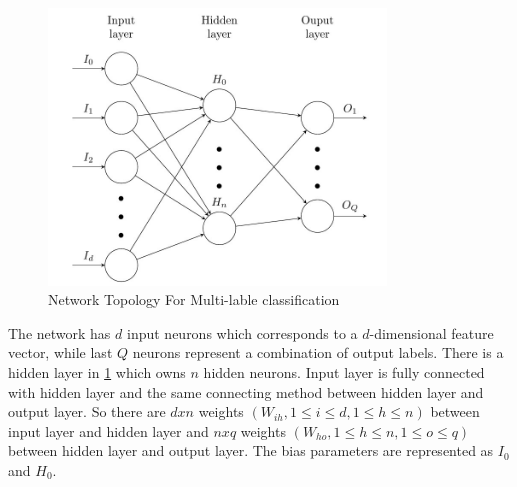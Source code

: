 \graphicspath{ {./Figures/} }
\begin{figure}[!htb]
\centering
\includegraphics[width=0.8\textwidth]{MultiLabelNet.jpeg}
\caption{\label{fig:MultiLabelNet}Network Topology For Multi-lable classification}
\end{figure}

The network has $d$ input neurons which corresponds to a $d$-dimensional feature vector, while last $Q$ neurons represent a combination of output labels. There is a hidden layer in \ref{fig:MultiLabelNet} which owns $n$ hidden neurons. Input layer is fully connected with hidden layer and the same connecting method between hidden layer and output layer. So there are $d x n$ weights $(W_{ih}, 1 \leq i \leq d, 1 \leq h \leq n)$ between input layer and hidden layer and $n x q$ weights $(W_{ho}, 1 \leq h \leq n , 1 \leq o \leq q)$ between hidden layer and output layer. The bias parameters are represented as $I_{0}$ and  $H_{0}$.










